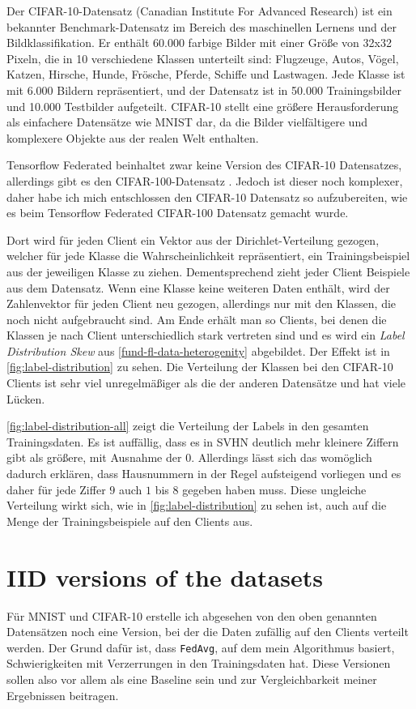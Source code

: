 Der CIFAR-10-Datensatz (Canadian Institute For Advanced Research) ist ein bekannter Benchmark-Datensatz im Bereich des maschinellen Lernens und der Bildklassifikation. Er enthält 60.000 farbige Bilder mit einer Größe von 32x32 Pixeln, die in 10 verschiedene Klassen unterteilt sind: Flugzeuge, Autos, Vögel, Katzen, Hirsche, Hunde, Frösche, Pferde, Schiffe und Lastwagen. Jede Klasse ist mit 6.000 Bildern repräsentiert, und der Datensatz ist in 50.000 Trainingsbilder und 10.000 Testbilder aufgeteilt. CIFAR-10 stellt eine größere Herausforderung als einfachere Datensätze wie MNIST dar, da die Bilder vielfältigere und komplexere Objekte aus der realen Welt enthalten. 

Tensorflow Federated beinhaltet zwar keine Version des CIFAR-10 Datensatzes, allerdings gibt es den CIFAR-100-Datensatz \cite{krizhevsky:2009}. Jedoch ist dieser noch komplexer, daher habe ich mich entschlossen den CIFAR-10 Datensatz so aufzubereiten, wie es beim Tensorflow Federated CIFAR-100 Datensatz gemacht wurde. 

Dort wird für jeden Client ein Vektor aus der Dirichlet-Verteilung gezogen, welcher für jede Klasse die Wahrscheinlichkeit repräsentiert, ein Trainingsbeispiel aus der jeweiligen Klasse zu ziehen. Dementsprechend zieht jeder Client Beispiele aus dem Datensatz. Wenn eine Klasse keine weiteren Daten enthält, wird der Zahlenvektor für jeden Client neu gezogen, allerdings nur mit den Klassen, die noch nicht aufgebraucht sind. Am Ende erhält man so Clients, bei denen die Klassen je nach Client unterschiedlich stark vertreten sind und es wird ein \textit{Label Distribution Skew} aus \autoref{fund-fl-data-heterogenity} abgebildet. Der Effekt ist in \autoref{fig:label-distribution} zu sehen. Die Verteilung der Klassen bei den CIFAR-10 Clients ist sehr viel unregelmäßiger als die der anderen Datensätze und hat viele Lücken.

\autoref{fig:label-distribution-all} zeigt die Verteilung der Labels in den gesamten Trainingsdaten. Es ist auffällig, dass es in SVHN deutlich mehr kleinere Ziffern gibt als größere, mit Ausnahme der $0$. Allerdings lässt sich das womöglich dadurch erklären, dass Hausnummern in der Regel aufsteigend vorliegen und es daher für jede Ziffer $9$ auch $1$ bis $8$ gegeben haben muss. Diese ungleiche Verteilung wirkt sich, wie in \autoref{fig:label-distribution} zu sehen ist, auch auf die Menge der Trainingsbeispiele auf den Clients aus.

\section{IID versions of the datasets}\label{sec:iid-dataset-creation}
Für MNIST und CIFAR-10 erstelle ich abgesehen von den oben genannten Datensätzen noch eine Version, bei der die Daten zufällig auf den Clients verteilt werden. Der Grund dafür ist, dass \texttt{FedAvg}, auf dem mein Algorithmus basiert, Schwierigkeiten mit Verzerrungen in den Trainingsdaten hat. Diese Versionen sollen also vor allem als eine Baseline sein und zur Vergleichbarkeit meiner Ergebnissen beitragen.

